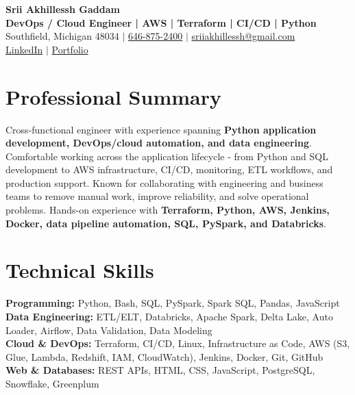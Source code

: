 \documentclass[letterpaper,10pt]{article}
\begin{document}
\fontsize{9.35pt}{10.45pt}\selectfont

\begin{center}
    {\LARGE \textbf{Srii Akhillessh Gaddam}} \\[-1pt]
    \textbf{DevOps / Cloud Engineer | AWS | Terraform | CI/CD | Python} \\[2pt]
    Southfield, Michigan 48034 $|$
    \href{tel:6468752400}{646-875-2400} $|$
    \href{mailto:sriiakhillessh@gmail.com}{sriiakhillessh@gmail.com} \\[1pt]
    \href{https://www.linkedin.com/in/srii-akhiilessh-gaddam-b48668191/}{LinkedIn} $|$
    \href{https://sriiakhillesshg.github.io/portfolio/}{Portfolio}
\end{center}
\vspace{-8pt}

\section{Professional Summary}
\small{Cross-functional engineer with experience spanning \textbf{Python application development, DevOps/cloud automation, and data engineering}. Comfortable working across the application lifecycle - from Python and SQL development to AWS infrastructure, CI/CD, monitoring, ETL workflows, and production support. Known for collaborating with engineering and business teams to remove manual work, improve reliability, and solve operational problems. Hands-on experience with \textbf{Terraform, Python, AWS, Jenkins, Docker, data pipeline automation, SQL, PySpark, and Databricks}.}

\section{Technical Skills}
\small{
\textbf{Programming:} Python, Bash, SQL, PySpark, Spark SQL, Pandas, JavaScript \\
\textbf{Data Engineering:} ETL/ELT, Databricks, Apache Spark, Delta Lake, Auto Loader, Airflow, Data Validation, Data Modeling \\
\textbf{Cloud \& DevOps:} Terraform, CI/CD, Linux, Infrastructure as Code, AWS (S3, Glue, Lambda, Redshift, IAM, CloudWatch), Jenkins, Docker, Git, GitHub \\
\textbf{Web \& Databases:} REST APIs, HTML, CSS, JavaScript, PostgreSQL, Snowflake, Greenplum
}
\end{document}

